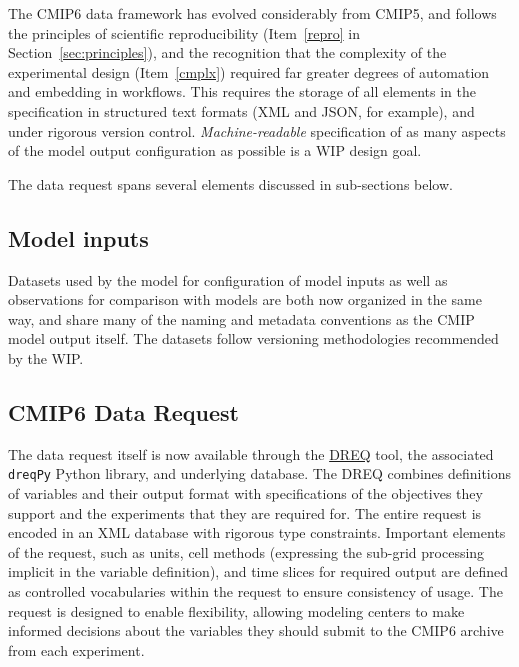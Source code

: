 \documentclass[gmd,manuscript]{copernicus}
\newcommand{\pipref}[1] {\citep{ref:#1}}
\newcommand{\secref}[1] {\mbox{Section  \ref{sec:#1}}}
\begin{document}
The CMIP6 data framework has evolved considerably from CMIP5, and
follows the principles of scientific reproducibility (Item~\ref{repro}
in \secref{principles}), and the recognition that the complexity of
the experimental design (Item~\ref{cmplx}) required far greater
degrees of automation and embedding in workflows. This requires the
storage of all elements in the specification in structured text
formats (XML and JSON, for example), and under rigorous version
control. \emph{Machine-readable} specification of as many aspects of
the model output configuration as possible is a WIP design goal.

The data request spans several elements discussed in sub-sections
below.

\subsection{Model inputs}
\label{sec:data-inputs}

Datasets used by the model for configuration of model inputs
\citep[\texttt{input4MIPs}, see][]{ref:duracketal2017} as well as
observations for comparison with models \citep[\texttt{obs4MIPs},
see][]{ref:teixeiraetal2014} are both now organized in the same way, 
and share many of the naming and metadata conventions as the
CMIP model output itself. The datasets follow versioning
methodologies recommended by the WIP.

\subsection{CMIP6 Data Request}
\label{sec:data-request}

The data request itself \pipref{juckesetal2015} is now available
through the \href{https://goo.gl/iNBQ9m}{DREQ} tool, the associated
\texttt{dreqPy} Python library, and underlying
database. The DREQ combines definitions of variables and their output
format with specifications of the objectives they support and the
experiments that they are required for. The entire request is encoded
in an XML database with rigorous type constraints. Important elements
of the request, such as units, cell methods (expressing the sub-grid
processing implicit in the variable definition), and time slices for
required output are defined as controlled vocabularies within the
request to ensure consistency of usage. The request is designed to
enable flexibility, allowing modeling centers to make informed
decisions about the variables they should submit to the CMIP6 archive
from each experiment.
\end{document}
